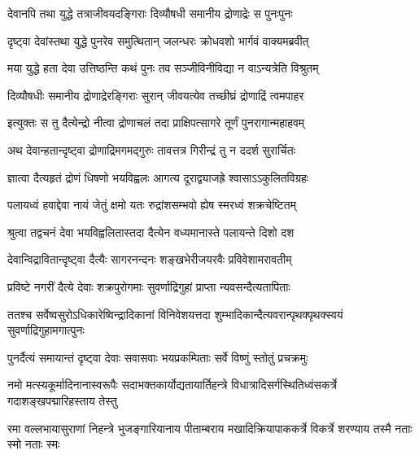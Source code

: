 \twolineshloka
{देवानपि तथा युद्धे तत्राजीवयदङ्गिराः}
{दिव्यौषधी समानीय द्रोणाद्रेः स पुनःपुनः} %

\twolineshloka
{दृष्ट्वा देवांस्तथा युद्धे पुनरेव समुत्थितान्}
{जलन्धरः क्रोधवशो भार्गवं वाक्यमब्रवीत्} %


\twolineshloka
{मया युद्धे हता देवा उत्तिष्ठन्ति कथं पुनः}
{तव सञ्जीविनीविद्या न वाऽन्यत्रेति विश्रुतम्} %


\twolineshloka
{दिव्यौषधीः समानीय द्रोणाद्रेरङ्गिराः सुरान्}
{जीवयत्येव तच्छीघ्रं द्रोणाद्रिं त्वमपाहर} %


\twolineshloka
{इत्युक्तः स तु दैत्येन्द्रो नीत्वा द्रोणाचलं तदा}
{प्राक्षिपत्सागरे तूर्णं पुनरागान्महाहवम्} %

\twolineshloka
{अथ देवान्हतान्दृष्ट्वा द्रोणाद्रिमगमद्गुरुः}
{तावत्तत्र गिरीन्द्रं तु न ददर्श सुरार्चितः} %

\twolineshloka
{ज्ञात्वा दैत्यहृतं द्रोणं धिषणो भयविह्वलः}
{आगत्य दूराद्व्याजह्रे श्वासाऽऽकुलितविग्रहः} %

\twolineshloka
{पलायध्वं हवाद्देवा नायं जेतुं क्षमो यतः}
{रुद्रांशसम्भवो ह्येष स्मरध्वं शक्रचेष्टितम्} %

\twolineshloka
{श्रुत्वा तद्वचनं देवा भयविह्वलितास्तदा}
{दैत्येन वध्यमानास्ते पलायन्ते दिशो दश} %

\twolineshloka
{देवान्विद्रावितान्दृष्ट्वा दैत्यैः सागरनन्दनः}
{शङ्खभेरीजयरवैः प्रविवेशामरावतीम्} %

\twolineshloka
{प्रविष्टे नगरीं दैत्ये देवाः शक्रपुरोगमाः}
{सुवर्णाद्रिगुहां प्राप्ता न्यवसन्दैत्यतापिताः} %

\twolineshloka
{ततश्च सर्वेष्वसुरोऽधिकारेष्विन्द्रादिकानां विनिवेशयत्तदा}
{शुम्भादिकान्दैत्यवरान्पृथक्पृथक्स्वयं सुवर्णाद्रिगुहामगात्पुनः} %





\twolineshloka
{पुनर्दैत्यं समायान्तं दृष्ट्वा देवाः सवासवाः}
{भयप्रकम्पिताः सर्वे विष्णुं स्तोतुं प्रचक्रमुः} %

\fourlineindentedshloka
{नमो मत्स्यकूर्मादिनानास्वरूपैः}
{सदाभक्तकार्योद्यतायार्तिहन्त्रे}
{विधात्रादिसर्गस्थितिध्वंसकर्त्रे}
{गदाशङ्खपद्मारिहस्ताय तेस्तु} %

\fourlineindentedshloka
{रमा वल्लभायासुराणां निहन्त्रे}
{भुजङ्गारियानाय पीताम्बराय}
{मखादिक्रियापाककर्त्रे विकर्त्रे}
{शरण्याय तस्मै नताः स्मो नताः स्मः} %

